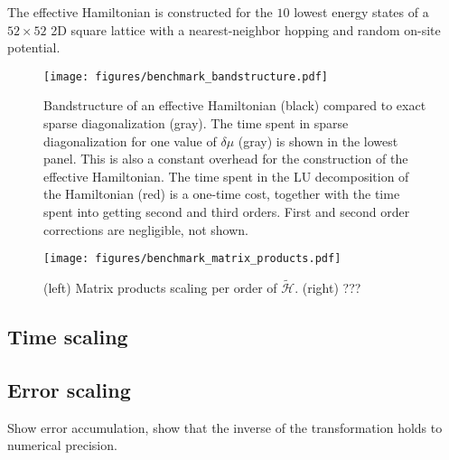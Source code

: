 

The effective Hamiltonian is constructed for the $10$ lowest energy
states of a $52 \times 52$ 2D square lattice with a nearest-neighbor
hopping and random on-site potential.
\begin{figure}[h]
    \centering
    \texttt{[image: figures/benchmark\_bandstructure.pdf]}
    \caption{
        Bandstructure of an effective Hamiltonian (black) compared to exact
        sparse diagonalization (gray).
        The time spent in sparse diagonalization for one value of $\delta \mu$
        (gray) is shown in the lowest panel.
        This is also a constant overhead for the construction of the effective
        Hamiltonian.
        The time spent in the LU decomposition of the Hamiltonian (red) is a
        one-time cost, together with the time spent into getting second
        and third orders.
        First and second order corrections are negligible, not shown.
        }
    \label{fig:benchmark_bandstructure}
\end{figure}

\co{}

\begin{figure}[h]
    \centering
    \texttt{[image: figures/benchmark\_matrix\_products.pdf]}
    \caption{
        (left) Matrix products scaling per order of $\tilde{\mathcal{H}}$.
        (right) ???
    }
    \label{fig:benchmark_matrix_products}
\end{figure}
\subsection{Time scaling}


\subsection{Error scaling}

Show error accumulation, show that the inverse of the transformation holds to numerical precision.
